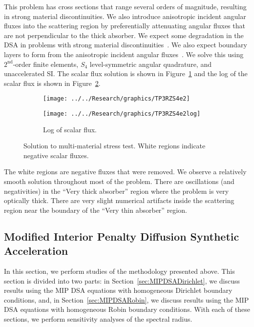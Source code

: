 \documentclass[12pt,letterpaper]{article}
\begin{document}
This problem has cross sections that range several orders of magnitude, resulting in strong material discontinuities. We also introduce anisotropic incident angular fluxes into the scattering region by preferentially attenuating angular fluxes that are not perpendicular to the thick absorber. We expect some degradation in the DSA in problems with strong material discontinuities~\cite{WangDissertation}. We also expect boundary layers to form from the anisotropic incident angular fluxes~\cite{AdamsDFEMDiffLimit}. We solve this using $2^\text{nd}$-order finite elements, $S_4$ level-symmetric angular quadrature, and unaccelerated SI. The scalar flux solution is shown in Figure~\ref{fig:TP2RZS4e2} and the log of the scalar flux is shown in Figure~\ref{fig:TP2RZS4e2log}.
%
\begin{figure}[!htb]
\centering
\begin{subfigure}{\textwidth}
\centering
\texttt{[image: ../../Research/graphics/TP3RZS4e2]}
\label{fig:TP2RZS4e2}
\end{subfigure}
\begin{subfigure}{\textwidth}
\centering
\texttt{[image: ../../Research/graphics/TP3RZS4e2log]}
\caption{Log of scalar flux.}
\label{fig:TP2RZS4e2log}
\end{subfigure}
\caption{Solution to multi-material stress test. White regions indicate negative scalar fluxes.}
\label{fig:RZMultiMaterial}
\end{figure}
%
The white regions are negative fluxes that were removed. We observe a relatively smooth solution throughout most of the problem. There are oscillations (and negativities) in the ``Very thick absorber'' region where the problem is very optically thick. There are very slight numerical artifacts inside the scattering region near the boundary of the ``Very thin absorber'' region.


\FloatBarrier

\subsection{Modified Interior Penalty Diffusion Synthetic Acceleration}
\label{sec:ResultsMIP}
In this section, we perform studies of the methodology presented above. This section is divided into two parts: in Section~\ref{sec:MIPDSADirichlet}, we discuss results using the MIP DSA equations with homogeneous Dirichlet boundary conditions, and, in Section~\ref{sec:MIPDSARobin}, we discuss results using the MIP DSA equations with homogeneous Robin boundary conditions. With each of these sections, we perform sensitivity analyses of the spectral radius.
\end{document}
